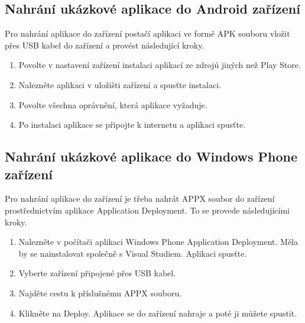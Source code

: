 \subsection{Nahrání ukázkové aplikace do Android zařízení}
Pro nahrání aplikace do zařízení postačí aplikaci ve formě APK souboru vložit přes USB kabel do zařízení a provést následující kroky.
\begin{enumerate}
\item Povolte v nastavení zařízení instalaci aplikací ze zdrojů jiných než Play Store.
\item Nalezněte aplikaci v uložišti zařízení a spusťte instalaci.
\item Povolte všechna oprávnění, která aplikace vyžaduje.
\item Po instalaci aplikace se připojte k internetu a aplikaci spusťte.
\end{enumerate}
\subsection{Nahrání ukázkové aplikace do Windows Phone zařízení}
Pro nahrání aplikace do zařízení je třeba nahrát APPX soubor do zařízení prostřednictvím aplikace Application Deployment. To se provede následujícími kroky.
\begin{enumerate}
\item Nalezněte v počítači aplikaci Windows Phone Application Deployment. Měla by se nainstalovat společně s Visual Studiem. Aplikaci spusťte.
\item Vyberte zařízení připojené přes USB kabel.
\item Najděte cestu k příslušnému APPX souboru. 
\item Klikněte na Deploy. Aplikace se do zařízení nahraje a poté ji můžete spustit.
\end{enumerate}


